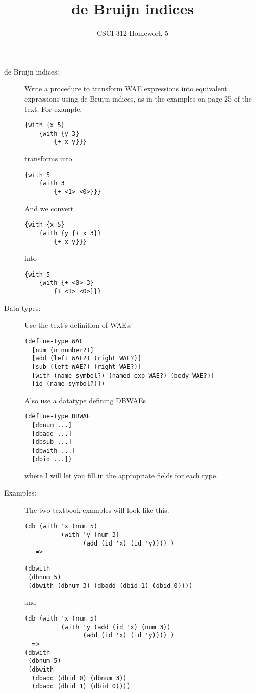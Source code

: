 \documentclass[12pt]{article}
\author{CSCI 312 Homework 5}
\title{de Bruijn indices}
\begin{document}
\maketitle

\begin{description}

\item[de Bruijn indices:]  Write a procedure to transform WAE expressions
into equivalent expressions using de Bruijn indices, as in the examples
on page 25 of the text.  For example,
\begin{lstlisting}
{with {x 5}
    {with {y 3}
        {+ x y}}}
\end{lstlisting}
transforms into
\begin{lstlisting}
{with 5
    {with 3
        {+ <1> <0>}}}
\end{lstlisting}
And we convert
\begin{lstlisting}
{with {x 5}
    {with {y {+ x 3}}
        {+ x y}}}
\end{lstlisting}
into
\begin{lstlisting}
{with 5
    {with {+ <0> 3}
        {+ <1> <0>}}}
\end{lstlisting} 

\item[Data types:]
Use the text's definition of WAEs:
\begin{lstlisting}
(define-type WAE
  [num (n number?)]
  [add (left WAE?) (right WAE?)]
  [sub (left WAE?) (right WAE?)]
  [with (name symbol?) (named-exp WAE?) (body WAE?)]
  [id (name symbol?)])
\end{lstlisting}
Also use a datatype defining DBWAEs
\begin{lstlisting}
(define-type DBWAE
  [dbnum ...]
  [dbadd ...]
  [dbsub ...]
  [dbwith ...]
  [dbid ...])
\end{lstlisting}
where I will let you fill in the appropriate fields for each type.

\item[Examples:]
The two textbook examples will look like this:
\begin{lstlisting}
(db (with 'x (num 5)
          (with 'y (num 3)
                (add (id 'x) (id 'y)))) )
   =>

(dbwith
 (dbnum 5)
 (dbwith (dbnum 3) (dbadd (dbid 1) (dbid 0))))
\end{lstlisting}
 and
 \begin{lstlisting}
(db (with 'x (num 5)
          (with 'y (add (id 'x) (num 3))
                (add (id 'x) (id 'y)))) )
  =>
(dbwith
 (dbnum 5)
 (dbwith
  (dbadd (dbid 0) (dbnum 3))
  (dbadd (dbid 1) (dbid 0))))
\end{lstlisting}


\end{description}
\end{document}

